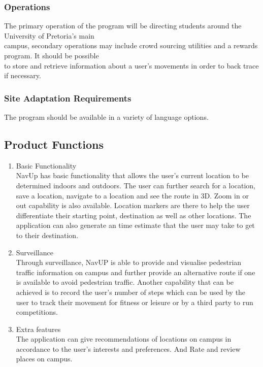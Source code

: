 \documentclass[a4paper,10pt]{article}
\begin{document}
		\subsubsection{Operations}
			The primary operation of the program will be directing students around the University of Pretoria's main\\				campus, secondary operations may include crowd sourcing utilities and a rewards program. It should be possible\\			to store and retrieve information about a user's movements in order to back trace if necessary.\\
		\subsubsection{Site Adaptation Requirements}
			The program should be available in a variety of language options.\\
		
	\subsection{Product Functions}
		\begin{enumerate}
			\item Basic Functionality\\
			NavUp has basic functionality that allows the user's current location to be determined indoors and outdoors. The user can further search for a location, save a location, navigate to a location and see the route in 3D. Zoom in or out capability is also available. Location markers  are there to help the user differentiate their starting point, destination as well as other locations. The application can also generate an time estimate that the user may take to get to their destination.
			
			\item Surveillance\\
			Through surveillance, NavUP is able to provide and visualise pedestrian traffic information on campus and further provide an alternative route if one is available to avoid pedestrian traffic. Another capability that can be achieved is to record the user's number of steps which can be used by the user to track their movement for fitness or leisure or by a third party to run competitions.
			
			\item Extra features\\
			The application can give recommendations of locations on campus in accordance to the user's interests and preferences. And Rate and review places on campus.
		\end{enumerate}				
					
\end{document}
